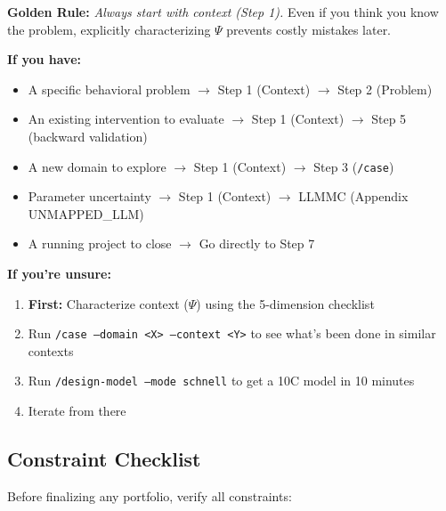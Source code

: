 \begin{tcolorbox}[colback=yellow!5!white,colframe=yellow!75!black,
    title=\textbf{Entry Point Selection: Where Do I Start?}]

\textbf{Golden Rule:} \textit{Always start with context (Step 1).} Even if you think you know the problem, explicitly characterizing $\Psi$ prevents costly mistakes later.

\textbf{If you have:}
\begin{itemize}[noitemsep]
    \item A specific behavioral problem $\to$ Step 1 (Context) $\to$ Step 2 (Problem)
    \item An existing intervention to evaluate $\to$ Step 1 (Context) $\to$ Step 5 (backward validation)
    \item A new domain to explore $\to$ Step 1 (Context) $\to$ Step 3 (\texttt{/case})
    \item Parameter uncertainty $\to$ Step 1 (Context) $\to$ LLMMC (Appendix UNMAPPED_LLM)
    \item A running project to close $\to$ Go directly to Step 7
\end{itemize}

\textbf{If you're unsure:}
\begin{enumerate}[noitemsep]
    \item \textbf{First:} Characterize context ($\Psi$) using the 5-dimension checklist
    \item Run \texttt{/case --domain <X> --context <Y>} to see what's been done in similar contexts
    \item Run \texttt{/design-model --mode schnell} to get a 10C model in 10 minutes
    \item Iterate from there
\end{enumerate}

\end{tcolorbox}

\subsection{Constraint Checklist}
\label{sec:25-constraint-checklist}

Before finalizing any portfolio, verify all constraints:

